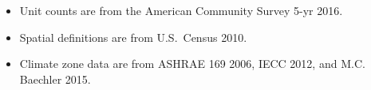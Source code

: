 \begin{itemize}
\item Unit counts are from the American Community Survey 5-yr 2016.
\item Spatial definitions are from U.S.~Census 2010.
\item Climate zone data are from ASHRAE 169 2006, IECC 2012, and M.C. Baechler 2015.
\end{itemize}
